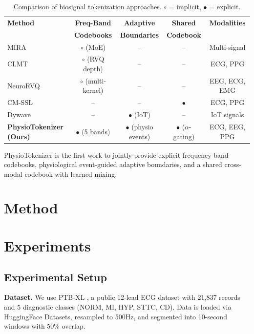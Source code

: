 \documentclass[letterpaper]{article}
\begin{document}
\begin{table}[h]
\centering
\caption{Comparison of biosignal tokenization approaches. $\circ$ = implicit,
$\bullet$ = explicit.}
\label{tab:positioning}
\begin{tabular}{lcccc}
\toprule
\textbf{Method} & \textbf{Freq-Band} & \textbf{Adaptive} & \textbf{Shared} & \textbf{Modalities} \\
& \textbf{Codebooks} & \textbf{Boundaries} & \textbf{Codebook} & \\
\midrule
MIRA \cite{mira2025}      & $\circ$ (MoE) & -- & -- & Multi-signal \\
CLMT \cite{cui2026clmt}   & $\circ$ (RVQ depth) & -- & -- & ECG, PPG \\
NeuroRVQ \cite{barmpas2025neurorvq} & $\circ$ (multi-kernel) & -- & -- & EEG, ECG, EMG \\
CM-SSL \cite{cmssl2026}   & -- & -- & $\bullet$ & ECG, PPG \\
Dywave \cite{dywave2026}  & -- & $\bullet$ (IoT) & -- & IoT signals \\
\midrule
\textbf{PhysioTokenizer (Ours)} & $\bullet$ (5 bands) & $\bullet$ (physio events) & $\bullet$ ($\alpha$-gating) & ECG, EEG, PPG \\
\bottomrule
\end{tabular}
\end{table}

PhysioTokenizer is the first work to jointly provide explicit frequency-band
codebooks, physiological event-guided adaptive boundaries, and a shared
cross-modal codebook with learned mixing.


\section{Method}


\section{Experiments}

\subsection{Experimental Setup}

\textbf{Dataset.} We use PTB-XL \cite{ptbxl}, a public 12-lead ECG dataset
with 21,837 records and 5 diagnostic classes (NORM, MI, HYP, STTC, CD).
Data is loaded via HuggingFace Datasets, resampled to 500Hz, and segmented
into 10-second windows with 50\% overlap.
\end{document}
